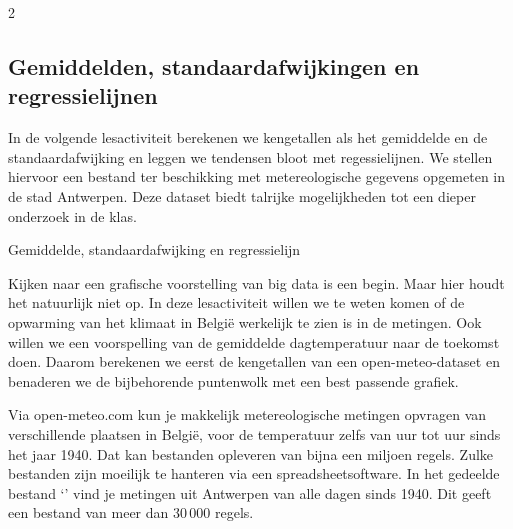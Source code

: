 \begin{multicols}{2}


\subsection{Gemiddelden, standaardafwijkingen en regressielijnen}

In de volgende lesactiviteit berekenen we kengetallen als het gemiddelde en de standaardafwijking en leggen we  tendensen bloot met regessielijnen. We stellen hiervoor een bestand ter beschikking met metereologische gegevens opgemeten in de stad Antwerpen. Deze dataset biedt talrijke mogelijkheden tot een dieper onderzoek in de klas. 

\end{multicols}
\begin{lesactiviteit}{Gemiddelde, standaardafwijking en regressielijn}
    
   Kijken naar een grafische voorstelling van big data is een begin. Maar hier houdt het natuurlijk niet op. In deze lesactiviteit willen we te weten komen of de opwarming van het klimaat in België werkelijk te zien is in de metingen. Ook willen we een voorspelling van de gemiddelde dagtemperatuur naar de toekomst doen. Daarom berekenen we eerst de kengetallen van een open-meteo-dataset en benaderen we de bijbehorende puntenwolk met een best passende grafiek.

    Via open-meteo.com kun je makkelijk metereologische metingen opvragen van verschillende plaatsen in België, voor de temperatuur zelfs van uur tot uur sinds het jaar 1940. Dat kan bestanden opleveren van bijna een miljoen regels. Zulke bestanden zijn moeilijk te hanteren via een spreadsheetsoftware. In het gedeelde bestand `' vind je metingen uit Antwerpen van alle dagen sinds 1940. Dit geeft een bestand van meer dan $30\,000$ regels. 

    \begin{vraagenantwoord}

   
    
    

\end{vraagenantwoord}
\end{lesactiviteit}
